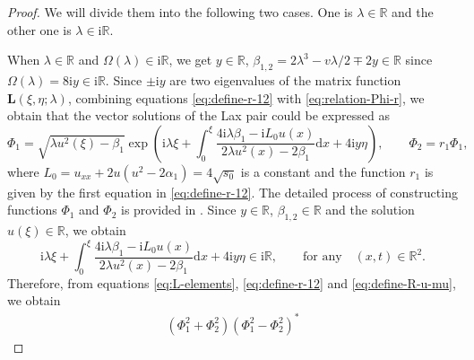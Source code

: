 \documentclass[11pt,reqno]{amsart}
\newcommand{\ii}{\mathrm{i}}
\newcommand{\dd}{\mathrm{d}}
\numberwithin{equation}{section}
\begin{document}
\begin{proof}
	We will divide them into the following two cases. 
	One is $\lambda\in  \mathbb{R}$ and the other one is $\lambda\in  \ii \mathbb{R}$.
	 
	When $\lambda\in  \mathbb{R}$ and $\Omega(\lambda)\in \ii \mathbb{R}$, we get $y\in \mathbb{R}$, $\beta_{1,2}=2\lambda^3 - v\lambda/2 \mp 2y\in \mathbb{R}$ since $\Omega(\lambda)=8\ii y\in \ii \mathbb{R}$.
	Since $\pm \ii y$ are two eigenvalues of the matrix function $\mathbf{L}(\xi,\eta;\lambda)$, combining equations \eqref{eq:define-r-12} with \eqref{eq:relation-Phi-r}, we obtain that the vector solutions of the Lax pair could be expressed as
	\begin{equation}\nonumber
		\Phi_{1}= \sqrt{\lambda u^2(\xi)-\beta_1}\exp\left( \ii \lambda \xi+\int_{0}^{\xi}\frac{4\ii\lambda \beta_1- \ii L_0 u(x)}{2\lambda u^2(x)-2\beta_1}\dd x+4\ii y \eta\right), \qquad
		\Phi_{2}= r_1\Phi_{1},	
	\end{equation}
	where $L_0=u_{xx}+2u (u^2-2\alpha_1)=4\sqrt{s_0}$ is a constant and the function $r_1$ is given by the first equation in \eqref{eq:define-r-12}. 
	The detailed process of constructing functions $\Phi_{1}$ and $\Phi_{2}$ is provided in \cite{LingS-23-mKdV-stability}.
	Since $y\in \mathbb{R}$, $\beta_{1,2}\in \mathbb{R}$ and the solution $u(\xi)\in \mathbb{R}$, we obtain 
	\begin{equation}\nonumber
		\ii \lambda \xi+\int_{0}^{\xi}\frac{4\ii\lambda \beta_1- \ii L_0 u(x)}{2\lambda u^2(x)-2\beta_1}\dd x+4\ii y \eta\in \ii \mathbb{R}, \qquad \text{for any} \quad (x,t)\in \mathbb{R}^2.
	\end{equation}
	Therefore, from equations \eqref{eq:L-elements}, \eqref{eq:define-r-12} and \eqref{eq:define-R-u-mu},
we obtain 
	\begin{equation}\nonumber
		\begin{split} 
			(\Phi_{1}^2+\Phi_{2}^2)(\Phi_{1}^2-\Phi_{2}^2)^*

\end{split}
\end{equation}
\end{proof}
\end{document}
